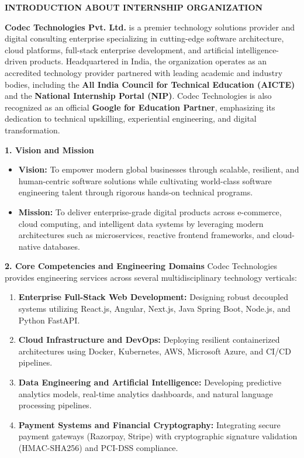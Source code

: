 \newpage
\thispagestyle{fancy}
\begin{center}
    {\fontsize{16}{20}\selectfont \textbf{INTRODUCTION ABOUT INTERNSHIP ORGANIZATION}}\\[0.8cm]
\end{center}

\noindent \textbf{Codec Technologies Pvt. Ltd.} is a premier technology solutions provider and digital consulting enterprise specializing in cutting-edge software architecture, cloud platforms, full-stack enterprise development, and artificial intelligence-driven products. Headquartered in India, the organization operates as an accredited technology provider partnered with leading academic and industry bodies, including the \textbf{All India Council for Technical Education (AICTE)} and the \textbf{National Internship Portal (NIP)}. Codec Technologies is also recognized as an official \textbf{Google for Education Partner}, emphasizing its dedication to technical upskilling, experiential engineering, and digital transformation.

\vspace{0.4cm}
\noindent \textbf{1. Vision and Mission}
\begin{itemize}[leftmargin=2.0em]
    \item \textbf{Vision:} To empower modern global businesses through scalable, resilient, and human-centric software solutions while cultivating world-class software engineering talent through rigorous hands-on technical programs.
    \item \textbf{Mission:} To deliver enterprise-grade digital products across e-commerce, cloud computing, and intelligent data systems by leveraging modern architectures such as microservices, reactive frontend frameworks, and cloud-native databases.
\end{itemize}

\vspace{0.4cm}
\noindent \textbf{2. Core Competencies and Engineering Domains}
Codec Technologies provides engineering services across several multidisciplinary technology verticals:
\begin{enumerate}[leftmargin=2.0em]
    \item \textbf{Enterprise Full-Stack Web Development:} Designing robust decoupled systems utilizing React.js, Angular, Next.js, Java Spring Boot, Node.js, and Python FastAPI.
    \item \textbf{Cloud Infrastructure and DevOps:} Deploying resilient containerized architectures using Docker, Kubernetes, AWS, Microsoft Azure, and CI/CD pipelines.
    \item \textbf{Data Engineering and Artificial Intelligence:} Developing predictive analytics models, real-time analytics dashboards, and natural language processing pipelines.
    \item \textbf{Payment Systems and Financial Cryptography:} Integrating secure payment gateways (Razorpay, Stripe) with cryptographic signature validation (HMAC-SHA256) and PCI-DSS compliance.
\end{enumerate}

